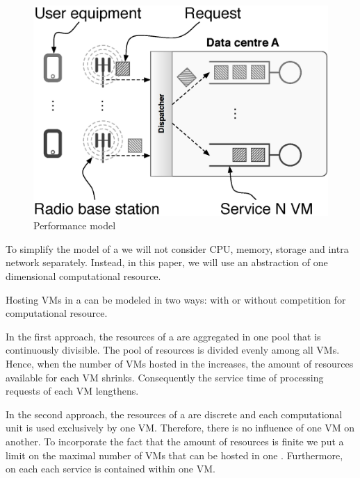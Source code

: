 \subsection{\Dc}
\begin{figure}[tb]
	\centering
	\includegraphics[width=\linewidth]{dc_model.eps} 
	\caption{Performance model}
	\label{fig:performance_model}
\end{figure}

To simplify the model of a \dc{} we will not consider CPU, memory, storage and intra \dc{} network separately.
Instead, in this paper, we will use an abstraction of one dimensional computational resource.

Hosting VMs in a \dc{} can be modeled in two ways: with or without competition for computational resource.

In the first approach, the resources of a \dc{} are aggregated in one pool that is continuously divisible.
The pool of resources is divided evenly among all VMs.
Hence, when the number of VMs hosted in the \dc{} increases, the amount of resources available for each VM shrinks.
Consequently the service time of processing requests of each VM lengthens.

In the second approach, the resources of a \dc{} are discrete and each computational unit is used exclusively by one VM.
Therefore, there is no influence of one VM on another.
To incorporate the fact that the amount of resources is finite we put a limit on the maximal number of VMs that can be hosted in one \dc{}. Furthermore, on each \dc each service is contained within one VM. 

